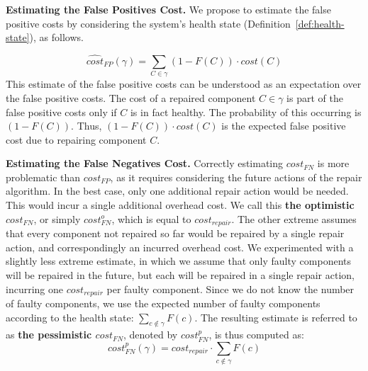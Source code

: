 \documentclass[a4paper,11pt]{report}
\begin{document}
\noindent \textbf{Estimating the False Positives Cost.}
We propose to estimate the false positive costs by considering the system's health state (Definition~\ref{def:health-state}), as follows.

\[ \widehat{cost}_{FP}(\gamma)=\sum_{C\in \gamma} (1-F(C))\cdot cost(C) \]
This estimate of the false positive costs can be understood as an expectation over the false positive costs. The cost of a repaired component $C\in\gamma$ is part of the false positive costs only if $C$ is in fact healthy. The probability of this occurring is $(1-F(C))$. Thus, $(1-F(C))\cdot cost(C)$ is the expected false positive cost due to repairing component $C$.

\noindent \textbf{Estimating the False Negatives Cost.}
Correctly estimating $cost_{FN}$ is more problematic than $cost_{FP}$, as it requires considering the future actions of the repair algorithm.
In the best case, only one additional repair action would be needed. This would incur a single additional overhead cost. We call this {\bf the optimistic $cost_{FN}$}, or simply $cost_{FN}^o$, which is equal to $cost_{repair}$.
The other extreme assumes that every component not repaired so far would be repaired by a single repair action, and correspondingly an incurred overhead cost. We experimented with a slightly less extreme estimate, in which we assume that only faulty components will be repaired in the future, but each will be repaired in a single repair action, incurring one $cost_{repair}$ per faulty component.
Since we do not know the number of faulty components, we use the expected number of faulty components according to the health state: $\sum_{c\notin \gamma} F(c)$. The resulting estimate is referred to as {\bf the pessimistic $cost_{FN}$}, denoted by $cost_{FN}^p$, is thus computed as:
\[ cost_{FN}^p(\gamma)=cost_{repair}\cdot \sum_{c\notin \gamma} F(c)\]
\end{document}
